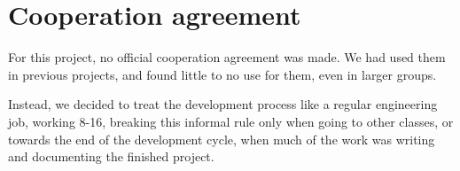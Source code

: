 \chapter{Cooperation agreement}
For this project, no official cooperation agreement was made. We had used them in previous projects, and found little to no use for them, even in larger groups. 

Instead, we decided to treat the development process like a regular engineering job, working 8-16, breaking this informal rule only when going to other classes, or towards the end of the development cycle, when much of the work was writing and documenting the finished project. 